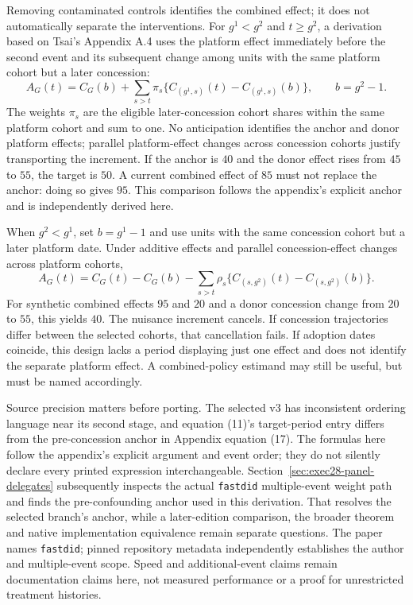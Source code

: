 Removing contaminated controls identifies the combined effect; it does not automatically separate the interventions.
For $g^1<g^2$ and $t\geq g^2$, a derivation based on Tsai's Appendix A.4 uses the platform effect immediately before the
second event and its subsequent change among units with the same platform cohort but a later concession:
\[
 A_G(t)=C_G(b)+\sum_{s>t}\pi_s\{C_{(g^1,s)}(t)-C_{(g^1,s)}(b)\},\qquad b=g^2-1.
\]
The weights $\pi_s$ are the eligible later-concession cohort shares within the same platform cohort and sum to one.
No anticipation identifies the anchor and donor platform effects; parallel platform-effect changes across concession
cohorts justify transporting the increment. If the anchor is $40$ and the donor effect rises from $45$ to $55$, the
target is $50$. A current combined effect of $85$ must not replace the anchor: doing so gives $95$.
This comparison follows the appendix's explicit anchor and is independently derived here.~\citep{exec28_panel_tsai,exec28_panel_reference}

When $g^2<g^1$, set $b=g^1-1$ and use units with the same concession cohort but a later platform date. Under additive
effects and parallel concession-effect changes across platform cohorts,
\[
 A_G(t)=C_G(t)-C_G(b)-\sum_{s>t}\rho_s\{C_{(s,g^2)}(t)-C_{(s,g^2)}(b)\}.
\]
For synthetic combined effects $95$ and $20$ and a donor concession change from $20$ to $55$, this yields $40$.
The nuisance increment cancels. If concession trajectories differ between the selected cohorts, that cancellation fails.
If adoption dates coincide, this design lacks a period displaying just one effect and does not identify the separate
platform effect. A combined-policy estimand may still be useful, but must be named accordingly.~\citep{exec28_panel_tsai,exec28_panel_reference}

Source precision matters before porting. The selected v3 has inconsistent ordering language near its second stage, and
equation (11)'s target-period entry differs from the pre-concession anchor in Appendix equation (17).
The formulas here follow the appendix's explicit argument and event order; they do not silently declare every printed
expression interchangeable. Section~\ref{sec:exec28-panel-delegates} subsequently inspects the actual
\texttt{fastdid} multiple-event weight path and finds the pre-confounding anchor used in this derivation.
That resolves the selected branch's anchor, while a later-edition comparison, the broader theorem and native
implementation equivalence remain separate questions. The paper names \texttt{fastdid}; pinned repository metadata
independently establishes the author and multiple-event scope. Speed and additional-event claims remain documentation
claims here, not measured performance or a proof for unrestricted treatment histories.~\citep{exec28_panel_tsai,exec28_panel_software}

